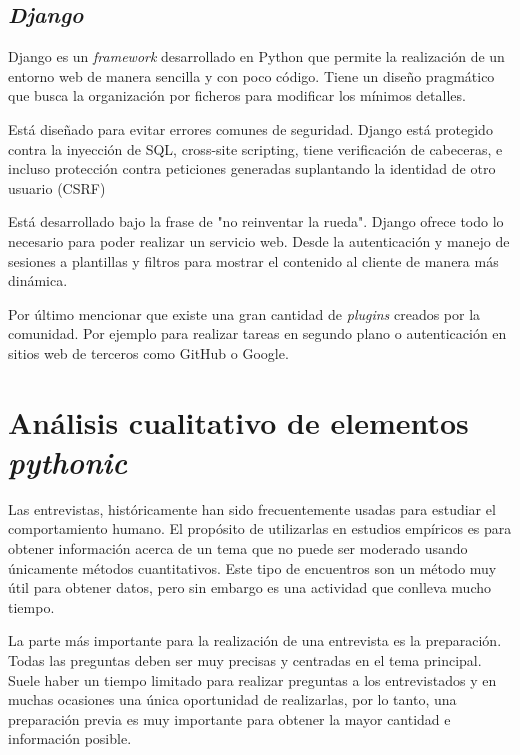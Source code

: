 \documentclass[a4paper, 12pt]{book}
\begin{document}
\section{\textit{Django}}
  
Django es un \textit{framework} desarrollado en Python que permite la realización de un entorno web de manera sencilla y con poco código. Tiene un diseño pragmático que busca la organización por ficheros para modificar los mínimos detalles.

Está diseñado para evitar errores comunes de seguridad. Django está protegido contra la inyección de SQL, cross-site scripting, tiene verificación de cabeceras, e incluso protección contra peticiones generadas suplantando la identidad de otro usuario (CSRF)

Está desarrollado bajo la frase de "no reinventar la rueda". Django ofrece todo lo necesario para poder realizar un servicio web. Desde la autenticación y manejo de sesiones a plantillas y filtros para mostrar el contenido al cliente de manera más dinámica.

Por último mencionar que existe una gran cantidad de \textit{plugins} creados por la comunidad. Por ejemplo para realizar tareas en segundo plano o autenticación en sitios web de terceros como GitHub o Google.




\cleardoublepage
\chapter{Análisis cualitativo de elementos \textit{pythonic}}
\label{chap:cualitativo}

Las entrevistas, históricamente han sido frecuentemente usadas para estudiar el comportamiento humano. El propósito de utilizarlas en estudios empíricos es para obtener información acerca de un tema que no puede ser moderado usando únicamente métodos cuantitativos. Este tipo de encuentros son un método muy útil para obtener datos, pero sin embargo es una actividad que conlleva mucho tiempo. 

La parte más importante para la realización de una entrevista es la preparación. Todas las preguntas deben ser muy precisas y centradas en el tema principal. Suele haber un tiempo limitado para realizar preguntas a los entrevistados y en muchas ocasiones una única oportunidad de realizarlas, por lo tanto, una preparación previa es muy importante para obtener la mayor cantidad e información posible.
\end{document}
